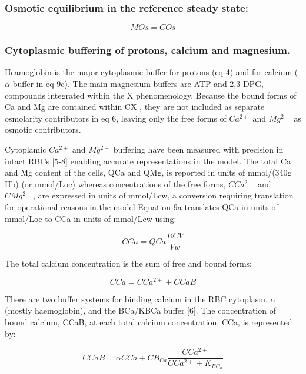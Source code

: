 \documentclass[a4paper]{article}
\newcommand{\med}[1]{M#1}
\newcommand{\cell}[1]{C#1}
\newcommand{\MOs}{\med{Os}}
\newcommand{\KBCa}{K_{{BC}_a}}
\newcommand{\CMgtp}{\cell{Mg^{2+}}}
\newcommand{\CCatp}{\cell{Ca^{2+}}}
\newcommand{\COs}{\cell{Os}}
\newcommand{\CCa}{\cell{Ca}}
\newcommand{\CCaB}{\cell{CaB}}
\newcommand{\CBCa}{\cell{B_{Ca}}}
\newcommand{\QCa}{QCa}
\begin{document}
\subsubsection{Osmotic equilibrium in the reference steady state:}

\begin{equation}
\MOs = \COs
\end{equation}

\subsubsection{Cytoplasmic buffering of protons, calcium and magnesium.}
Heamoglobin is the major cytoplasmic buffer for protons (eq 4) and for calcium ($\alpha$-buffer in eq 9c).  The main magnesium buffers are ATP and 2,3-DPG, compounds integrated within the X  phenomenology.  Because the bound forms of Ca and Mg are contained within CX , they are not included as separate osmolarity contributors in eq 6, leaving only the free forms of $Ca^{2+}$ and $Mg^{2+}$ as osmotic contributors.  

Cytoplamic $Ca^{2+}$ and $Mg^{2+}$ buffering have been measured with precision in intact RBCs [5-8] enabling accurate representations in the model.  The total Ca and Mg content of the cells, QCa and QMg, is reported in units of mmol/(340g Hb) (or mmol/Loc) whereas concentrations of the free forms, $\CCatp$ and $\CMgtp$, are expressed in units of mmol/Lcw, a conversion requiring translation for operational reasons in the model   Equation 9a translates QCa in units of mmol/Loc to CCa in units of mmol/Lcw using:


\setcounter{equation}{0}
\renewcommand{\theequation}{9.\alph{equation}}

\begin{equation}
\CCa = \QCa\frac{RCV}{Vw}  
\end{equation}
 

The total calcium concentration is the sum of free and bound forms:

\begin{equation}
\CCa = \CCatp + \CCaB
\end{equation}

There are two buffer systems for binding calcium in the RBC cytoplasm, $\alpha$ (mostly haemoglobin), and the BCa/KBCa buffer [6]. The concentration of bound calcium, CCaB, at each total calcium concentration, CCa, is represented by:

\begin{equation}
\CCaB = \alpha\CCa + \CBCa\frac{\CCatp}{\CCatp + \KBCa}
\end{equation}
\end{document}
